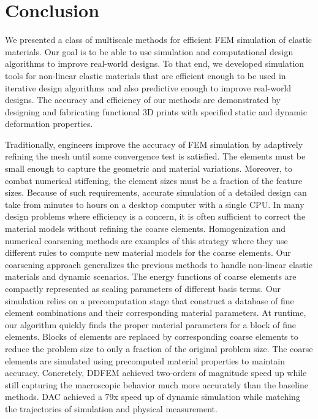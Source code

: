 \chapter{Conclusion}
We presented a class of multiscale methods for efficient FEM simulation of elastic materials.
Our goal is to be able to use simulation and computational design algorithms to improve real-world designs.
To that end, we developed simulation tools for non-linear elastic materials that are efficient enough to be used in iterative design algorithms and also predictive enough to improve real-world designs.
The accuracy and efficiency of our methods are demonstrated by designing and fabricating functional 3D prints with specified static and dynamic deformation properties.

Traditionally, engineers improve the accuracy of FEM simulation by adaptively refining the mesh until some convergence test is satisfied.
The elements must be small enough to capture the geometric and material variations.
Moreover, to combat numerical stiffening, the element sizes must be a fraction of the feature sizes.
Because of such requirements, accurate simulation of a detailed design can take from minutes to hours on a desktop computer with a single CPU.
In many design problems where efficiency is a concern, it is often sufficient to correct the material models without refining the coarse elements.
Homogenization and numerical coarsening methods are examples of this strategy where they use different rules to compute new material models for the coarse elements.
Our coarsening approach generalizes the previous methods to handle non-linear elastic materials and dynamic scenarios.
The energy functions of coarse elements are compactly represented as scaling parameters of different basis terms.
Our simulation relies on a precomputation stage that construct a database of fine element combinations and their corresponding material parameters.
At runtime, our algorithm quickly finds the proper material parameters for a block of fine elements.
Blocks of elements are replaced by corresponding coarse elements to reduce the problem size to only a fraction of the original problem size.
The coarse elements are simulated using precomputed material properties to maintain accuracy.
Concretely, DDFEM achieved two-orders of magnitude speed up while still capturing the macroscopic behavior much more accurately than the baseline methods.
DAC achieved a 79x speed up of dynamic simulation while matching the trajectories of simulation and physical measurement.

